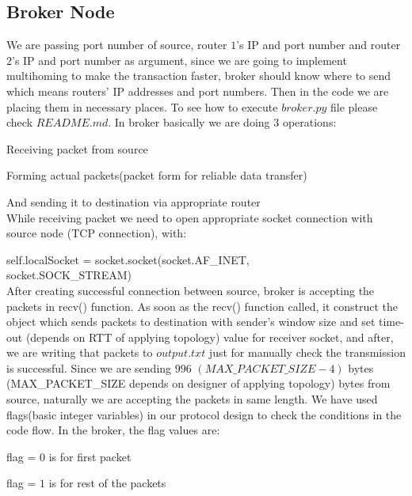 \subsection{Broker Node}
We are passing port number of source, router $1$'s IP and port number and router $2$'s IP and port number as argument, since we are going to implement multihoming to make the transaction faster, broker should know where to send which means routers' IP addresses and port numbers. Then in the code we are placing them in necessary places. To see how to execute $broker.py$ file please check $README.md$. In broker basically we are doing 3 operations:

Receiving packet from source

Forming actual packets(packet form for reliable data transfer)

And sending it to destination via appropriate router\\
While receiving packet we need to open appropriate socket connection with source node (TCP connection), with:

self.localSocket = socket.socket(socket.AF\_INET,\\
socket.SOCK\_STREAM)\\
After creating successful connection between source, broker is accepting the packets in recv() function. As soon as the recv() function called, it construct the object which sends packets to destination with sender's window size and set time-out (depends on RTT of applying topology) value for receiver socket, and after, we are writing that packets to $output.txt$ just for manually check the transmission is successful. Since we are sending $996$ $(MAX\_PACKET\_SIZE - 4)$ bytes (MAX\_PACKET\_SIZE depends on designer of applying topology) bytes from source, naturally we are accepting the packets in same length. We have used flags(basic integer variables) in our protocol design to check the conditions in the code flow. In the broker, the flag values are:

flag = $0$ is for first packet

flag = $1$ is for rest of the packets

